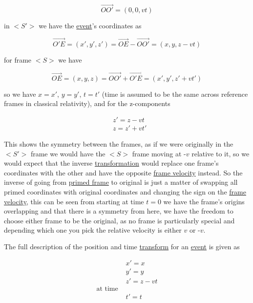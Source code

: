\begin{equation}
	\overrightarrow{OO'}=(0,0,vt)
\end{equation}

in $<S'>$ we have the \hyperlink{def-event}{event}'s coordinates as

\begin{equation}
	\overrightarrow{O'E} = ( x{'}, y{'}, z{'} ) = \overrightarrow{OE} - \overrightarrow{OO'} = (x,y,z-vt)
	\label{eq: classical event}
\end{equation}

for frame $<S>$ we have

\begin{equation}
	\overrightarrow{OE} = (x,y,z) = \overrightarrow{OO'} + \overrightarrow{O'E} = (x{'},y',z'+vt')
	\label{eq: classical event 2}
\end{equation}

so we have $x=x'$, $y=y'$, $t=t'$ (time is assumed to be the same across reference frames in classical relativity), and for the z-components

\begin{equation}
	\begin{aligned}
		 & z' = z - vt \\
		 & z = z'+vt'
	\end{aligned}
\end{equation}

This shows the symmetry between the frames, as if we were originally in the $<S'>$ frame we would have the $<S>$ frame moving at -$v$ relative to it, so we would expect that the inverse \hyperlink{def-transform}{transformation} would replace one frame's coordinates with the other and have the opposite \hyperlink{def-frame-velocity}{frame velocity} instead.
So the inverse of going from \hyperlink{def-Primed-Frame}{primed frame} to original is just a matter of swapping all primed coordinates with original coordinates and changing the sign on the \hyperlink{def-frame-velocity}{frame velocity}, this can be seen from starting at time $t=0$ we have the frame's origins overlapping and that there is a symmetry from here, we have the freedom to choose either frame to be the original, as no frame is particularly special and depending which one you pick the relative velocity is either $v$ or -$v$.

The full description of the position and time \hyperlink{def-transform}{transform} for an \hyperlink{def-event}{event} is given as

\begin{equation}
	\begin{aligned}
		 & x'=x               \\
		 & y'=y               \\
		 & z' = z-vt          \\
		\text{at time \ \ \ } \\
		 & t'= t
	\end{aligned}
	\label{eq: Galilean transformation}
\end{equation}

